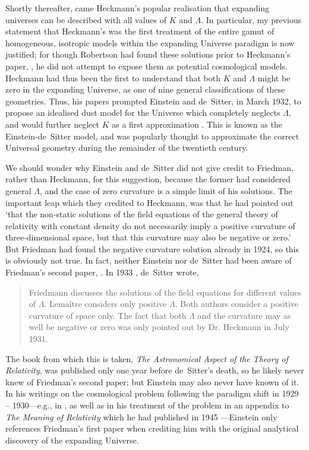 Shortly thereafter, came Heckmann's popular realisation that expanding universes can be described with all values of $K$ and $\Lambda$. In particular, my previous statement that Heckmann's was the first treatment of the entire gamut of homogeneous, isotropic models within the expanding Universe paradigm is now justified; for though Robertson had found these solutions prior to Heckmann's paper, \cite{Heckmann1931}, he did not attempt to expose them as potential cosmological models. Heckmann had thus been the first to understand that both $K$ and $\Lambda$ might be zero in the expanding Universe, as one of nine general classifications of these geometries. Thus, his papers prompted Einstein and de~Sitter, in March 1932, to propose an idealised dust model for the Universe which completely neglects $\Lambda$, and would further neglect $K$ as a first approximation \cite{Einstein1932}. This is known as the Einstein-de~Sitter model, and was popularly thought to approximate the correct Universal geometry during the remainder of the twentieth century.

We should wonder why Einstein and de~Sitter did not give credit to Friedman, rather than Heckmann, for this suggestion, because the former had considered general $\Lambda$, and the case of zero curvature is a simple limit of his solutions. The important leap which they credited to Heckmann, was that he had pointed out `that the non-static solutions of the field equations of the general theory of relativity with constant density do not necessarily imply a positive curvature of three-dimensional space, but that this curvature may also be negative or zero.' But Friedman had found the negative curvature solution already in 1924, so this is obviously not true. In fact, neither Einstein nor de~Sitter had been aware of Friedman's second paper, \cite{Friedmann1924,Friedmann1999b}. In 1933 \cite{deSitter1933a}, de~Sitter wrote,
\begin{quotation}
Friedmann discusses the solutions of the field equations for different values of $\Lambda$. Lema\^{i}tre considers only positive $\Lambda$. Both authors consider a positive curvature of space only. The fact that both $\Lambda$ and the curvature may as well be negative or zero was only pointed out by Dr. Heckmann in July 1931.
\end{quotation}
The book from which this is taken, \textit{The Astronomical Aspect of the Theory of Relativity}, was published only one year before de~Sitter's death, so he likely never knew of Friedman's second paper; but Einstein may also never have known of it. In his writings on the cosmological problem following the paradigm shift in 1929 -- 1930---e.g., in \cite{Einstein1931}, as well as in his treatment of the problem in an appendix to \textit{The Meaning of Relativity} which he had published in 1945 \cite{Einstein1945}---Einstein only references Friedman's first paper \cite{Friedmann1922,Friedmann1999a} when crediting him with the original analytical discovery of the expanding Universe. 

